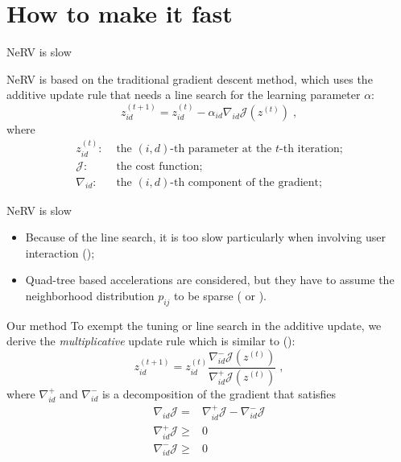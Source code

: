 \documentclass[first=dgreen,second=purple,logo=yellowexc]{aaltoslides}
\begin{document}
\section{How to make it fast}
\begin{frame}{NeRV is slow}

NeRV is based on the traditional gradient descent method, which uses the additive update rule that needs a line search for the learning parameter $\alpha$:
\[
z^{(t+1)}_{id}=z^{(t)}_{id}-\alpha_{id} \nabla_{id} \mathcal{J}(z^{(t)})\;,
\]
where
\begin{align*}
z^{(t)}_{id}:&\mbox{ the $(i,d)$-th parameter at the $t$-th iteration;}\\
\mathcal{J}:&\mbox{ the cost function;}\\
\nabla_{id}:&\mbox{ the $(i,d)$-th component of the gradient;}
\end{align*}
\end{frame}

\begin{frame}{NeRV is slow}
\begin{itemize}
\item Because of the line search, it is too slow particularly when involving user interaction (\cite{peltonen13eurovis});
\item Quad-tree based accelerations are considered, but they have to assume the neighborhood distribution $p_{ij}$ to be sparse (\cite{yang13icml} or \cite{vandermaaten13iclr}).
\end{itemize}
\end{frame}

\begin{frame}{Our method}
To exempt the tuning or line search in the additive update, we derive the \emph{multiplicative} update rule which is similar to (\cite{yang10mlsp}):
\[
z^{(t+1)}_{id}=z^{(t)}_{id}\frac{\nabla^-_{id} \mathcal{J}(z^{(t)})}{\nabla^+_{id} \mathcal{J}(z^{(t)})}\;,
\]
where $\nabla_{id}^+$ and $\nabla_{id}^-$ is a decomposition of the gradient that satisfies
\begin{align*}
\nabla_{id}\mathcal{J} =& \nabla_{id}^+\mathcal{J}-\nabla_{id}^-\mathcal{J}\\
\nabla_{id}^+\mathcal{J} \ge& 0\\
\nabla_{id}^-\mathcal{J} \ge& 0
\end{align*}
\end{frame}
\end{document}
